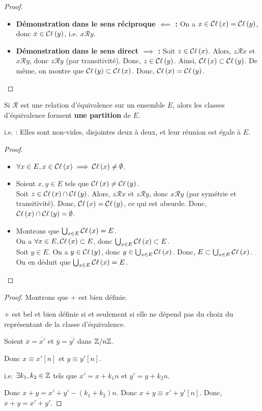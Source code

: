 \documentclass[12pt,a4paper]{report}
\begin{document}
\begin{proof}
    \begin{itemize}
        \item \textbf{Démonstration dans le sens réciproque $\impliedby$ :} On a $x\in\mathcal{C}\ell\left(x\right) = \mathcal{C}\ell\left(y\right)$, donc $x\in\mathcal{C}\ell\left(y\right)$, i.e. $x\mathcal{R}y$.
        \item \textbf{Démonstration dans le sens direct $\implies$ :} Soit $z \in \mathcal{C}\ell\left(x\right)$. Alors, $z \mathcal{R} x$ et $x \mathcal{R} y$, donc $z \mathcal{R} y$ (par transitivité). Donc, $z \in \mathcal{C}\ell\left(y\right)$. Ainsi, $\mathcal{C}\ell\left(x\right) \subset \mathcal{C}\ell\left(y\right)$. De même, on montre que $\mathcal{C}\ell\left(y\right) \subset \mathcal{C}\ell\left(x\right)$. Donc, $\mathcal{C}\ell\left(x\right) = \mathcal{C}\ell\left(y\right)$.
    \end{itemize}
\end{proof}

\begin{property}
    Si $\mathcal{R}$ est une relation d'équivalence sur un ensemble $E$, alors les classes d'équivalence forment \textbf{une partition} de $E$.
    
    i.e. : Elles sont non-vides, disjointes deux à deux, et leur réunion est égale à $E$.
\end{property}

\begin{proof}
    \begin{itemize}
        \item $\forall x \in E, x\in \mathcal{C}\ell\left(x\right) \implies \mathcal{C}\ell\left(x\right) \ne \emptyset$.
        \item Soient $x,y \in E$ tels que $\mathcal{C}\ell\left(x\right) \ne \mathcal{C}\ell\left(y\right)$.\\Soit $z \in \mathcal{C}\ell\left(x\right) \cap \mathcal{C}\ell\left(y\right)$. Alors, $z \mathcal{R} x$ et $z \mathcal{R} y$, donc $x \mathcal{R} y$ (par symétrie et transitivité). Donc, $\mathcal{C}\ell\left(x\right) = \mathcal{C}\ell\left(y\right)$, ce qui est absurde. Donc, $\mathcal{C}\ell\left(x\right) \cap \mathcal{C}\ell\left(y\right) = \emptyset$.
        \item Montrons que $\bigcup_{x \in E} \mathcal{C}\ell\left(x\right) = E$.\\On a $\forall x \in E, \mathcal{C}\ell\left(x\right) \subset E$, donc $\bigcup_{x \in E} \mathcal{C}\ell\left(x\right) \subset E$.\\Soit $y \in E$. On a $y \in \mathcal{C}\ell\left(y\right)$, donc $y \in \bigcup_{x \in E} \mathcal{C}\ell\left(x\right)$. Donc, $E \subset \bigcup_{x \in E} \mathcal{C}\ell\left(x\right)$.\\On en déduit que $\bigcup_{x \in E} \mathcal{C}\ell\left(x\right) = E$.
    \end{itemize}
\end{proof}

\begin{proof}
    Montrons que $+$ est bien définie.

    + est bel et bien définie si et seulement si elle ne dépend pas du choix du représentant de la classe d'équivalence.

    Soient $\overline{x} = \overline{x'}$ et $\overline{y} = \overline{y'}$ dans $\mathbb{Z}/n\mathbb{Z}$.

    Donc $x \equiv x' [n]$ et $y \equiv y' [n]$.

    i.e. $\exists k_1,k_2 \in \mathbb{Z}$ tels que $x' = x + k_1 n$ et $y' = y + k_2 n$.

    Donc $x+y = x' + y' - (k_1 + k_2) n$.
    Donc $x + y \equiv x' + y' [n]$.
    Donc, $\overline{x+y} = \overline{x' + y'}$.
\end{proof}
\end{document}
